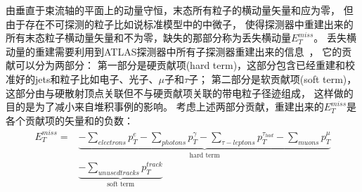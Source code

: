 由垂直于束流轴的平面上的动量守恒，末态所有粒子的横动量矢量和应为零，
但由于存在不可探测的粒子比如说标准模型中的中微子，
使得探测器中重建出来的所有末态粒子横动量矢量和不为零，缺失的那部分称为丢失横动量$E_T^{miss}$。
丢失横动量的重建需要利用到ATLAS探测器中所有子探测器重建出来的信息~\cite{LEPTON9}，
它的贡献可以分为两部分：
第一部分是硬贡献项(hard term)，这部分包含已经重建和校准好的jets和粒子比如电子、光子、$\mu$子和$\tau$子；
第二部分是软贡献项(soft term)，这部分由与硬散射顶点关联但不与硬贡献项关联的带电粒子径迹组成，
这样做的目的是为了减小来自堆积事例的影响。
考虑上述两部分贡献，重建出来的$E_T^{miss}$是各个贡献项的矢量和的负数：
\begin{equation} 
\label{eq:MISSET}
\begin{split}
E_T^{miss}=&\underbrace{ -\sum_{electrons} p_T^e -\sum_{photons} p_T^{\gamma}  -\sum_{\tau -leptons} p_T^{\tau_{had}}  -\sum_{muons} p_T^{\mu} }_\text{hard term}
\\
&\underbrace{  -\sum_{unused tracks} p_T^{track} }_\text{soft term}
\end{split}
\end{equation}
















